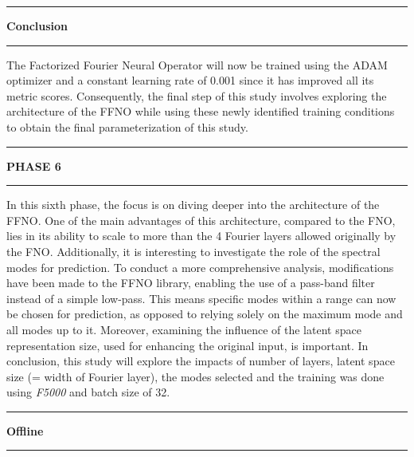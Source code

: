 \rule[0cm]{\linewidth}{0.025cm}
\begin{center}
\small \textbf{Conclusion}
\end{center}
\rule[0.3cm]{\linewidth}{0.025cm}

The Factorized Fourier Neural Operator will now be trained using the ADAM optimizer and a constant learning rate of 0.001 since it has improved all its metric scores. Consequently, the final step of this study involves exploring the architecture of the FFNO while using these newly identified training conditions to obtain the final parameterization of this study.

\newpage

\newpage

%
%
\rule[0cm]{\linewidth}{0.075cm}
\begin{center}
\Large \textbf{PHASE 6}
\end{center}
\vspace{0.15cm}
\rule[0.3cm]{\linewidth}{0.075cm}

In this sixth phase, the focus is on diving deeper into the architecture of the FFNO. One of the main advantages of this architecture, compared to the FNO, lies in its ability to scale to more than the 4 Fourier layers allowed originally by the FNO. Additionally, it is interesting to investigate the role of the spectral modes for prediction. To conduct a more comprehensive analysis, modifications have been made to the FFNO library, enabling the use of a pass-band filter instead of a simple low-pass. This means specific modes within a range can now be chosen for prediction, as opposed to relying solely on the maximum mode and all modes up to it. Moreover, examining the influence of the latent space representation size, used for enhancing the original input, is important. In conclusion, this study will explore the impacts of number of layers, latent space size (= width of Fourier layer), the modes selected and the training was done using \textit{F5000} and batch size of 32.

\rule[0cm]{\linewidth}{0.025cm}
\begin{center}
\small \textbf{Offline}
\end{center}
\rule[0.3cm]{\linewidth}{0.025cm}


